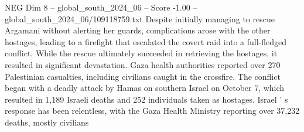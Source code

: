 \begin{textsample}{NEG Dim 8 – global\_south\_2024\_06 – Score -1.00 – global\_south\_2024\_06/109118759.txt}
Despite initially managing to rescue Argamani without alerting her guards, complications arose with the other hostages, leading to a firefight that escalated the covert raid into a full-fledged conflict.
While the rescue ultimately succeeded in retrieving the hostages, it resulted in significant devastation.
Gaza health authorities reported over 270 Palestinian casualties, including civilians caught in the crossfire.
The conflict began with a deadly attack by Hamas on southern Israel on October 7, which resulted in 1,189 Israeli deaths and 252 individuals taken as hostages.
Israel ' s response has been relentless, with the Gaza Health Ministry reporting over 37,232 deaths, mostly civilians

\end{textsample}
